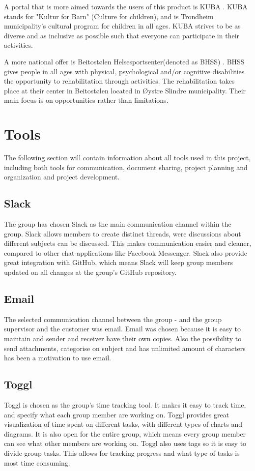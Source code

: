 A portal that is more aimed towards the users of this product is KUBA \cite{KUBA}. KUBA stands for "Kultur for Barn" (Culture for children), and is Trondheim municipality's cultural program for children in all ages. KUBA strives to be as diverse and as inclusive as possible such that everyone can participate in their activities.

A more national offer is Beitostølen Helsesportsenter(denoted as BHSS) \cite{BHSS}. BHSS gives people in all ages with physical, psychological and/or cognitive disabilities the opportunity to rehabilitation through activities. The rehabilitation takes place at their center in Beitostølen located in Øystre Slindre municipality. Their main focus is on opportunities rather than limitations.  

\section{Tools}
The following section will contain information about all tools used in this project, including both tools for communication, document sharing, project planning and organization and project development.

\subsection{Slack}
The group has chosen Slack \cite{Slack} as the main communication channel within the group. Slack allows members to create distinct threads, were discussions about different subjects can be discussed. This makes communication easier and cleaner, compared to other chat-applications like Facebook Messenger. Slack also provide great integration with GitHub, which means Slack will keep group members updated on all changes at the group's GitHub repository. 

\subsection{Email}
The selected communication channel between the group - and the group supervisor and the customer was email.
Email was chosen because it is easy to maintain and sender and receiver have their own copies. Also the possibility to send attachments, categorise on subject and has unlimited amount of characters has been a motivation to use email.  

\subsection{Toggl}
Toggl \cite{Toggl} is chosen as the group's time tracking tool. It makes it easy to track time, and specify what each group member are working on. Toggl provides great visualization of time spent on different tasks, with different types of charts and diagrams. It is also open for the entire group, which means every group member can see what other members are working on. Toggl also uses tags so it is easy to divide group tasks. This allows for tracking progress and what type of tasks is most time consuming.


